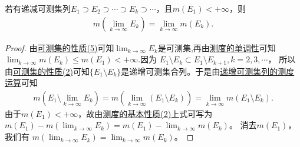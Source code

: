 \documentclass[../../main.tex]{subfiles}
\begin{document}
\begin{corollary}[递减可测集列的测度运算]\label{corollary:递减可测集列的测度运算}
若有递减可测集列$E_1\supset E_2\supset\cdots\supset E_k\supset\cdots$，且$m(E_1)<+\infty$，则
\begin{align}
m\left(\lim_{k\to\infty}E_k\right)=\lim_{k\to\infty}m(E_k).\label{eq:2.5}
\end{align}
\end{corollary}
\begin{proof}
由\hyperref[theorem:可测集的性质]{可测集的性质(5)}可知$\lim_{k\to\infty}E_k$是可测集,再由\hyperref[theorem:测度的基本性质]{测度的单调性}可知$\lim_{k\to\infty}m(E_k)\leqslant  m(E_1)<+\infty$.因为
$E_1\setminus E_k\subset E_1\setminus E_{k + 1},k = 2,3,\cdots$，
所以由\hyperref[theorem:可测集的性质]{可测集的性质(2)}可知$\{E_1\setminus E_k\}$是递增可测集合列。于是由\hyperref[theorem:递增可测集列的测度运算]{递增可测集列的测度运算}可知
\begin{align*}
m\left(E_1\setminus\lim_{k\to\infty}E_k\right)=m\left(\lim_{k\to\infty}(E_1\setminus E_k)\right)
=\lim_{k\to\infty}m(E_1\setminus E_k).
\end{align*}
由于$m(E_1)<+\infty$，故由\hyperref[theorem:测度的基本性质]{测度的基本性质(2)}上式可写为
$m(E_1)-m\left(\lim_{k\to\infty}E_k\right)=m(E_1)-\lim_{k\to\infty}m(E_k)$。
消去$m(E_1)$，我们有
$m\left(\lim_{k\to\infty}E_k\right)=\lim_{k\to\infty}m(E_k)$。 
\end{proof}
\end{document}
